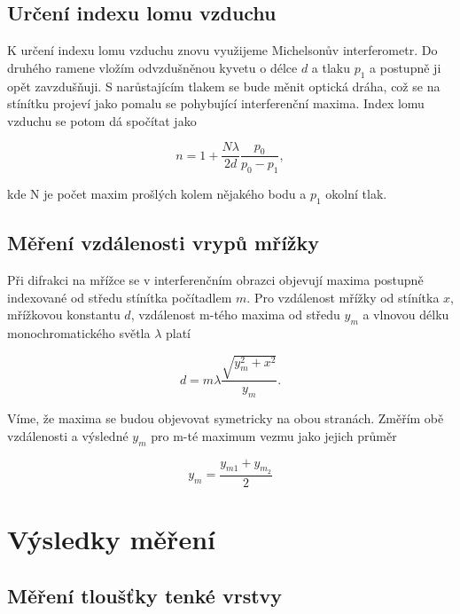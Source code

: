 \documentclass[a4paper,11pt]{article}
\begin{document}
\subsection{Určení indexu lomu vzduchu}

K určení indexu lomu vzduchu znovu využijeme Michelsonův interferometr. Do druhého ramene vložím odvzdušněnou kyvetu o délce $ d $ a tlaku $ p_1 $ a postupně ji opět zavzdušňuji. S narůstajícím tlakem se bude měnit optická dráha, což se na stínítku projeví jako pomalu se pohybující interferenční maxima. Index lomu vzduchu se potom dá spočítat jako

\begin{equation}
n = 1 + \frac{N \lambda}{2d} \frac{p_0}{p_0 - p_1},
\end{equation}

\noindent
kde N je počet maxim prošlých kolem nějakého bodu a $ p_1 $ okolní tlak.

\subsection{Měření vzdálenosti vrypů mřížky}

Při difrakci na mřížce se v interferenčním obrazci objevují maxima postupně indexované od středu stínítka počítadlem $ m $. Pro vzdálenost mřížky od stínítka $ x $, mřížkovou konstantu $ d $, vzdálenost m-tého maxima od středu $ y_m $ a vlnovou délku monochromatického světla $ \lambda $ platí

\begin{equation}
d = m \lambda \frac{\sqrt{y_m^2 + x^2} }{y_m}.
\end{equation}

Víme, že maxima se budou objevovat symetricky na obou stranách. Změřím obě vzdálenosti a výsledné $ y_m $ pro m-té maximum vezmu jako jejich průměr

\begin{equation}
y_m =  \frac{y_{m1} + y_{m_2}}{2}
\end{equation}

\newpage

\section{Výsledky měření}

\subsection{Měření tloušťky tenké vrstvy}
\end{document}
